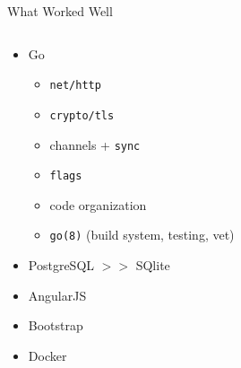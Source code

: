 \documentclass[11pt,aspectratio=169]{beamer}
\begin{document}
    \begin{frame}{What Worked Well}
            \begin{columns}
            \begin{column}{0.6\linewidth}
              \begin{itemize}
                \item<2-> Go
                    \begin{itemize}
                      \item<3-> \texttt{net/http}
                      \item<4-> \texttt{crypto/tls}
                      \item<5-> channels + \texttt{sync}
                      \item<6-> \texttt{flags}
                      \item<7-> code organization
                      \item<8-> \texttt{go(8)} (build system, testing, vet)
                    \end{itemize}
                \item<9-> PostgreSQL $>>$ SQlite 
                \item<10-> AngularJS 
                \item<11-> Bootstrap 
                \item<12-> Docker 
              \end{itemize}
            \end{column}
            \begin{column}{0.4\linewidth}
                \begin{tabular}{ll}

\end{tabular}
\end{column}
\end{columns}
\end{frame}
\end{document}
